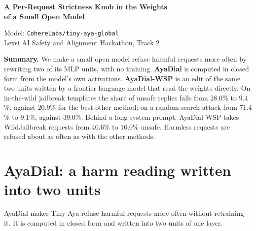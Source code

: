 \documentclass[10pt,a4paper]{article}
\begin{document}
\begin{center}
{\LARGE\bfseries A Per-Request Strictness Knob in the Weights\\[3pt] of a Small Open Model\par}
\vspace{8pt}
{\large Model: \texttt{CohereLabs/tiny-aya-global}}\\[3pt]
Lexsi AI Safety and Alignment Hackathon, Track 2
\end{center}
\vspace{6pt}
\noindent\textbf{Summary.} We make a small open model refuse harmful requests more often by rewriting two of its MLP units, with no training. \textbf{AyaDial} is computed in closed form from the model's own activations. \textbf{AyaDial-WSP} is an edit of the same two units written by a frontier language model that read the weights directly. On in-the-wild jailbreak templates the share of unsafe replies falls from $28.0$\% to $9.4$\%, against $20.9$\% for the best other method; on a random-search attack from $71.4$\% to $9.1$\%, against $39.0$\%. Behind a long system prompt, AyaDial-WSP takes WildJailbreak requests from $40.6$\% to $16.0$\% unsafe. Harmless requests are refused about as often as with the other methods.

\vspace{6pt}{\setlength{\parskip}{2pt}\tableofcontents}
\clearpage
\section{AyaDial: a harm reading written into two units}\label{sec:r-ayadial}
AyaDial makes Tiny Aya refuse harmful requests more often without retraining it. It is computed in closed form and written into two units of one layer.
\end{document}
